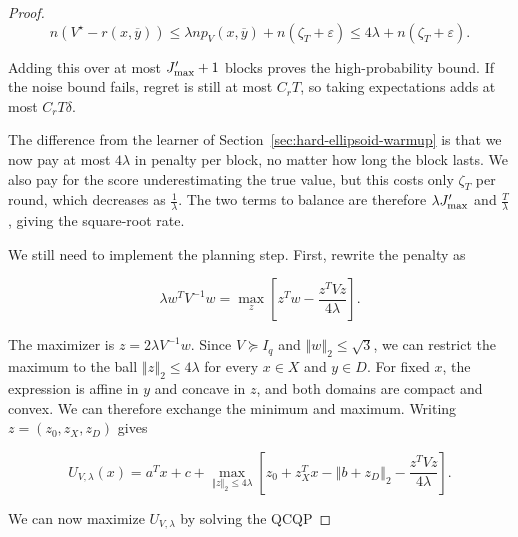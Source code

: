 {{\begin{proof}
\begin{equation*}
n \left( V^{\star} - r \left( x , \overline{y} \right) \right) \le \lambda n p_{V} \left( x , \overline{y} \right) + n \left( \zeta_{T} + \varepsilon \right) \le 4 \lambda + n \left( \zeta_{T} + \varepsilon \right) .
\end{equation*}


Adding this over at most $J_{\text{\normalfont max}}^{\prime} + 1$ blocks proves the high-probability
bound. If the noise bound fails, regret is still at most $C_{r} T$,
so taking expectations adds at most $C_{r} T \delta$.

The difference from the learner of Section~\ref{sec:hard-ellipsoid-warmup} is that we now pay at most $4 \lambda$
in penalty per block, no matter how long the block lasts. We also pay
for the score underestimating the true value, but this costs only
$\zeta_{T}$ per round, which decreases as $\frac{1}{\lambda}$. The two terms to
balance are therefore $\lambda J_{\text{\normalfont max}}^{\prime}$ and $\frac{T}{\lambda}$, giving the
square-root rate.

We still need to implement the planning step. First, rewrite the penalty as


\begin{equation*}
\lambda w^{T} V^{- 1} w = \operatorname*{max}_{z} \left[ z^{T} w - \frac{z^{T} V z}{4 \lambda} \right] .
\end{equation*}


The maximizer is $z = 2 \lambda V^{- 1} w$. Since $V \succeq I_{q}$ and
${\left\Vert w \right\Vert}_{2} \le \sqrt{3}$, we can restrict the maximum to the ball
${\left\Vert z \right\Vert}_{2} \le 4 \lambda$ for every $x \in X$ and $y \in D$. For fixed $x$,
the expression is affine in $y$ and concave in $z$, and both domains
are compact and convex. We can therefore exchange the minimum and
maximum. Writing $z = \left( z_{0} , z_{X} , z_{D} \right)$ gives



\begin{equation}
U_{V , \lambda} \left( x \right) = a^{T} x + c + \operatorname*{max}_{{\left\Vert z \right\Vert}_{2} \le 4 \lambda} \left[ z_{0} + z_{X}^{T} x - {\left\Vert b + z_{D} \right\Vert}_{2} - \frac{z^{T} V z}{4 \lambda} \right] .\label{eq:soft-conjugate-planner}
\end{equation}




We can now maximize $U_{V , \lambda}$ by solving the QCQP



\end{proof}}}
